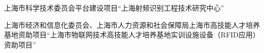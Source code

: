 
\begin{projects}{99}
    \item 上海市科学技术委员会平台建设项目“上海射频识别工程技术研究中心”
    \item 上海市经济和信息化委员会、上海市人力资源和社会保障局上海市高技能人才培养基地资助项目“上海市物联网技术高技能人才培养基地实训设施设备（RFID应用）资助项目”
\end{projects}
